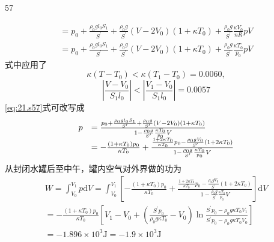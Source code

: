 \begin{solution}{57}
\begin{subsolution}
\begin{equation}
\begin{array}{l}
                = p _ {0} + \frac {\rho_{0} g l _ {0} S _ {1}}{S^{\prime}} + \frac {\rho_{0} g}{S^{\prime}} (V - 2 V _ {0}) (1 + \kappa T _ {0}) + \frac {\rho_{0} g}{S^{\prime}} \frac {\kappa V _ {0}}{n R} p V \\
                = p _ {0} + \frac {\rho_{0} g l _ {0} S _ {1}}{S^{\prime}} + \frac {\rho_{0} g}{S^{\prime}} (V - 2 V _ {0}) (1 + \kappa T _ {0}) + \frac {\rho_{0} g}{S^{\prime}} \frac {\kappa T _ {0}}{p _ {0}} p V
            \end{array}
            \label{eq:21.s57}
        \end{equation}
        式中应用了
        \begin{equation}
            \kappa (T - T _ {0}) < \kappa (T _ {1} - T _ {0}) = 0.0060,
            \label{eq:22.s57}
        \end{equation}
        \begin{equation}
            \left| \frac {V - V _ {0}}{S _ {1} l _ {0}} \right| < \left| \frac {V _ {1} - V _ {0}}{S _ {1} l _ {0}} \right| = 0.0057
            \label{eq:23.s57}
        \end{equation}
        \eqref{eq:21.s57}式可改写成
        \begin{equation}
            \begin{array}{r l}
                p & = \frac {p _ {0} + \frac {\rho_{0} g l _ {0} S _ {1}}{S^{\prime}} + \frac {\rho_{0} g}{S^{\prime}} (V - 2 V _ {0}) (1 + \kappa T _ {0})}{1 - \frac {\rho_{0} g}{S^{\prime}} \frac {\kappa T _ {0}}{p _ {0}} V} \\
                & = - \frac {(1 + \kappa T _ {0}) p _ {0}}{\kappa T _ {0}} + \frac {\frac {1 + 2 \kappa T _ {0}}{\kappa T _ {0}} p _ {0} - \frac {\rho_{0} g V _ {0}}{S^{\prime}} (1 + 2 \kappa T _ {0})}{1 - \frac {\rho_{0} g}{S^{\prime}} \frac {\kappa T _ {0}}{p _ {0}} V}
            \end{array}
            \label{eq:24.s57}
        \end{equation}
        从封闭水罐后至中午，罐内空气对外界做的功为
        \begin{equation}
            \begin{array}{l}
                W = \int_{V _ {0}}^{V _ {1}} p \mathrm{d} V = \int_{V _ {0}}^{V _ {1}} \left[ - \frac {(1 + \kappa T _ {0}) p _ {0}}{\kappa T _ {0}} + \frac {\frac {1 + 2 \kappa T _ {0}}{\kappa T _ {0}} p _ {0} - \frac {\rho_{0} g V _ {0}}{S^{\prime}} (1 + 2 \kappa T _ {0})}{1 - \frac {\rho_{0} g}{S^{\prime}} \frac {\kappa T _ {0}}{p _ {0}} V} \right] \mathrm{d} V \\
                = - \frac {(1 + \kappa T _ {0}) p _ {0}}{\kappa T _ {0}} \left[ V _ {1} - V _ {0} + \left(\frac {S^{\prime} p _ {0}}{\rho_{0} g \kappa T _ {0}} - V _ {0}\right) \ln \frac {S^{\prime} p _ {0} - \rho_{0} g \kappa T _ {0} V _ {1}}{S^{\prime} p _ {0} - \rho_{0} g \kappa T _ {0} V _ {0}} \right] \\
                = - 1.896 \times 10^{3} \mathrm{J} = - 1.9 \times 10^{3} \mathrm{J}
            \end{array}
            \label{eq:25.s57}
        \end{equation}


\end{subsolution}
\end{solution}
